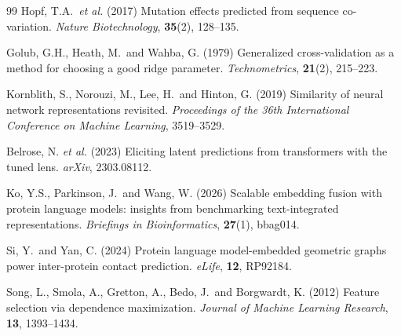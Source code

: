 \documentclass[numbered,webpdf,modern,large]{oup-authoring-template}
\newcommand{\rone}[1]{#1}
\newcommand{\rtwo}[1]{#1}
\begin{document}
\begin{thebibliography}{99}
Hopf, T.A.\ \textit{et al.} (2017)
Mutation effects predicted from sequence co-variation.
\textit{Nature Biotechnology}, \textbf{35}(2), 128--135.

\rone{Golub, G.H., Heath, M.\ and Wahba, G. (1979)
Generalized cross-validation as a method for choosing a good ridge parameter.
\textit{Technometrics}, \textbf{21}(2), 215--223.}

\rone{Kornblith, S., Norouzi, M., Lee, H.\ and Hinton, G. (2019)
Similarity of neural network representations revisited.
\textit{Proceedings of the 36th International Conference on Machine Learning},
3519--3529.}

\rone{Belrose, N. \textit{et al.} (2023)
Eliciting latent predictions from transformers with the tuned lens.
\textit{arXiv}, 2303.08112.}

\rtwo{Ko, Y.S., Parkinson, J.\ and Wang, W. (2026)
Scalable embedding fusion with protein language models: insights from
benchmarking text-integrated representations.
\textit{Briefings in Bioinformatics}, \textbf{27}(1), bbag014.}

\rtwo{Si, Y.\ and Yan, C. (2024)
Protein language model-embedded geometric graphs power inter-protein contact
prediction.
\textit{eLife}, \textbf{12}, RP92184.}

\rtwo{Song, L., Smola, A., Gretton, A., Bedo, J.\ and Borgwardt, K. (2012)
Feature selection via dependence maximization.
\textit{Journal of Machine Learning Research}, \textbf{13}, 1393--1434.}

\end{thebibliography}
\end{document}
